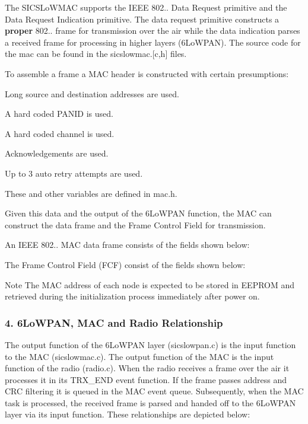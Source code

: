 \-The \-S\-I\-C\-S\-Lo\-W\-M\-A\-C supports the \-I\-E\-E\-E 802.. \-Data \-Request primitive and the \-Data \-Request \-Indication primitive. \-The data request primitive constructs a {\bfseries proper} 802.. frame for transmission over the air while the data indication parses a received frame for processing in higher layers (6\-Lo\-W\-P\-A\-N). \-The source code for the mac can be found in the sicslowmac.\mbox{[}c,h\mbox{]} files.

\-To assemble a frame a \-M\-A\-C header is constructed with certain presumptions\-:
\begin{DoxyEnumerate}
\item \-Long source and destination addresses are used.
\item \-A hard coded \-P\-A\-N\-I\-D is used.
\item \-A hard coded channel is used.
\item \-Acknowledgements are used.
\item \-Up to 3 auto retry attempts are used.
\end{DoxyEnumerate}

\-These and other variables are defined in mac.\-h.

\-Given this data and the output of the 6\-Lo\-W\-P\-A\-N function, the \-M\-A\-C can construct the data frame and the \-Frame \-Control \-Field for transmission.

\-An \-I\-E\-E\-E 802.. \-M\-A\-C data frame consists of the fields shown below\-:



\-The \-Frame \-Control \-Field (\-F\-C\-F) consist of the fields shown below\-:



\begin{DoxyNote}{\-Note}
\-The \-M\-A\-C address of each node is expected to be stored in \-E\-E\-P\-R\-O\-M and retrieved during the initialization process immediately after power on.
\end{DoxyNote}
\hypertarget{a00055_macrelationship}{}\subsubsection{4. 6\-Lo\-W\-P\-A\-N, M\-A\-C and Radio Relationship}\label{a00055_macrelationship}
\-The output function of the 6\-Lo\-W\-P\-A\-N layer (sicslowpan.\-c) is the input function to the \-M\-A\-C (sicslowmac.\-c). \-The output function of the \-M\-A\-C is the input function of the radio (radio.\-c). \-When the radio receives a frame over the air it processes it in its \-T\-R\-X\-\_\-\-E\-N\-D event function. \-If the frame passes address and \-C\-R\-C filtering it is queued in the \-M\-A\-C event queue. \-Subsequently, when the \-M\-A\-C task is processed, the received frame is parsed and handed off to the 6\-Lo\-W\-P\-A\-N layer via its input function. \-These relationships are depicted below\-:

